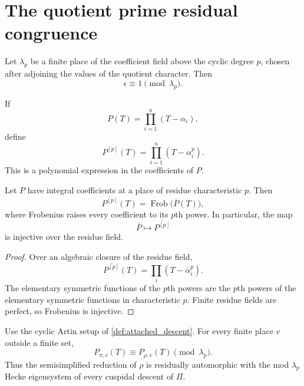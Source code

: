 \section{The quotient prime residual congruence}\label{sec:quotient_prime}

Let \(\lambda_p\) be a finite place of the coefficient field above the cyclic degree \(p\), chosen after adjoining the values of the quotient character. Then
\[
\epsilon\equiv1\pmod{\lambda_p}.
\]

\begin{definition}\label{def:frobenius_transform}
If
\[
P(T)=\prod_{i=1}^{n}(T-\alpha_i),
\]
define
\[
P^{[p]}(T)
=
\prod_{i=1}^{n}(T-\alpha_i^p).
\]
This is a polynomial expression in the coefficients of \(P\).
\end{definition}

\begin{lemma}\label{lem:frobenius_transform}
Let \(P\) have integral coefficients at a place of residue characteristic \(p\). Then
\[
\boxed{
\overline{P^{[p]}}(T)
=
\operatorname{Frob}\bigl(\overline P(T)\bigr),
}
\]
where Frobenius raises every coefficient to its \(p\)th power. In particular, the map
\[
\overline P\longmapsto\overline{P^{[p]}}
\]
is injective over the residue field.
\end{lemma}

\begin{proof}
Over an algebraic closure of the residue field,
\[
\overline{P^{[p]}}(T)
=
\prod_i(T-\overline\alpha_i^p).
\]
The elementary symmetric functions of the \(p\)th powers are the \(p\)th powers of the elementary symmetric functions in characteristic \(p\). Finite residue fields are perfect, so Frobenius is injective.
\end{proof}

\begin{theorem}\label{thm:quotient_prime_congruence}
Use the cyclic Artin setup of \cref{def:attached_descent}. For every finite place \(v\) outside a finite set,
\[
\boxed{
P_{\pi,v}(T)
\equiv
P_{\rho,v}(T)
\pmod{\lambda_p}.
}
\]
Thus the semisimplified reduction of \(\rho\) is residually automorphic with the mod \(\lambda_p\) Hecke eigensystem of every cuspidal descent of \(\Pi\).
\end{theorem}


